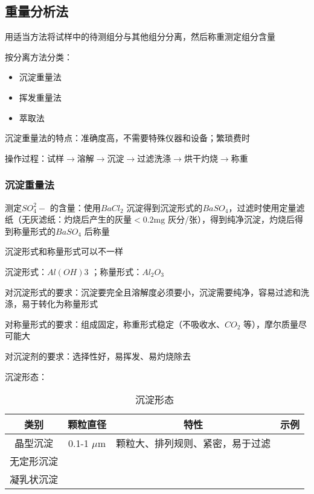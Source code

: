 \subsection{重量分析法}%
\label{sub:重量分析法}
\begin{defi}
    用适当方法将试样中的待测组分与其他组分分离，然后称重测定组分含量
\end{defi}
按分离方法分类：\begin{itemize}
    \item 沉淀重量法
    \item 挥发重量法
    \item 萃取法
\end{itemize}
\begin{notation}
    沉淀重量法的特点：准确度高，不需要特殊仪器和设备；繁琐费时

    操作过程：$\text{试样}\to \text{溶解}\to \text{沉淀}\to \text{过滤洗涤}\to \text{烘干灼烧}\to \text{称重}$
\end{notation}
\subsubsection*{沉淀重量法}%
\label{subsub:沉淀重量法}
\begin{eg}
测定$SO_4^2-$ 的含量：使用$BaCl_2$ 沉淀得到沉淀形式的$BaSO_4$，过滤时使用定量滤纸（无灰滤纸：灼烧后产生的灰量$<0.2\text{mg}$ 灰分/张），得到纯净沉淀，灼烧后得到称量形式的$BaSO_4$ 后称量
\end{eg}
\begin{notation}
    沉淀形式和称量形式可以不一样
    \begin{eg}
        沉淀形式：$Al(OH)3$ ；称量形式：$Al_2O_3$
    \end{eg}
    对沉淀形式的要求：沉淀要完全且溶解度必须要小，沉淀需要纯净，容易过滤和洗涤，易于转化为称量形式

    对称量形式的要求：组成固定，称重形式稳定（不吸收水、$CO_2$ 等），摩尔质量尽可能大

    对沉淀剂的要求：选择性好，易挥发、易灼烧除去
\end{notation}
\begin{notation}
沉淀形态：
\begin{table}[htpb]
    \centering
    \caption{沉淀形态}
    \label{tab:沉淀形态}
    \begin{tabular}{|c|c|c|c|}
    \hline
    类别 & 颗粒直径 & 特性 & 示例 \\
    \hline
晶型沉淀 & 0.1-1 $\mu$m & 颗粒大、排列规则、紧密，易于过滤 &  \\
\hline
无定形沉淀 &  &  &  \\
\hline
凝乳状沉淀 &  &  &  \\
\hline
    \end{tabular}
\end{table}
\end{notation}
